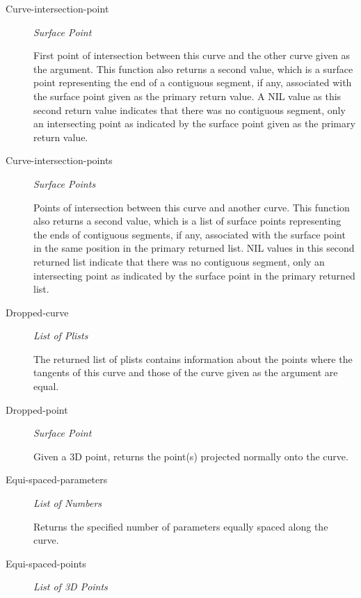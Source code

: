 \documentclass [11pt]{book}
\begin{document}
\begin{itemize}
\begin{description}
\item [Curve-intersection-point]
\emph{Surface Point}

  First point of intersection between this curve and the other curve given as the argument.
This function also returns a second value, which is a surface point representing the end of
a contiguous segment, if any, associated with the surface point given as the primary return value.
A NIL value as this second return value indicates that there was no contiguous segment, only an
intersecting point as indicated by the surface point given as the primary return value.




\item [Curve-intersection-points]
\emph{Surface Points}

  Points of intersection between this curve and another curve.
This function also returns a second value, which is a list of surface points representing the ends of
contiguous segments, if any, associated with the surface point in the same position in the primary returned list.
NIL values in this second returned list indicate that there was no contiguous segment, only an intersecting point
as indicated by the surface point in the primary returned list.




\item [Dropped-curve]
\emph{List of Plists}

 The returned list of plists contains information about the points where the tangents of this curve and those of the curve given as the argument
are equal.




\item [Dropped-point]
\emph{Surface Point}

 Given a 3D point, returns the point(s) projected normally onto the curve.




\item [Equi-spaced-parameters]
\emph{List of Numbers}

 Returns the specified number of parameters equally spaced along the curve.




\item [Equi-spaced-points]
\emph{List of 3D Points}


\end{description}
\end{itemize}
\end{document}

